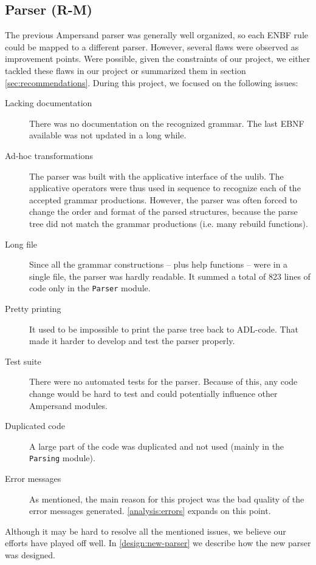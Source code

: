 
\subsection{Parser (R-M)}
\label{analysis:parser}
The previous Ampersand parser was generally well organized, so each ENBF rule could be mapped to a different parser.
However, several flaws were observed as improvement points.
Were possible, given the constraints of our project, we either tackled these flaws in our project or summarized them in section \autoref{sec:recommendations}.
During this project, we focused on the following issues:
\begin{description}
  \item[Lacking documentation]
    There was no documentation on the recognized grammar.
    The last EBNF available was not updated in a long while.
  
  \item[Ad-hoc transformations]
    The parser was built with the applicative interface of the uulib.
    The applicative operators were thus used in sequence to recognize each of the accepted grammar productions.
    However, the parser was often forced to change the order and format of the parsed structures, because the parse tree did not match the grammar productions (i.e. many rebuild functions).
    
  \item[Long file]
    Since all the grammar constructions -- plus help functions -- were in a single file, the parser was hardly readable.
    It summed a total of 823 lines of code only in the \texttt{Parser} module.
  
  \item[Pretty printing]
    It used to be impossible to print the parse tree back to ADL-code.
    That made it harder to develop and test the parser properly.
  
  \item[Test suite]
    There were no automated tests for the parser.
    Because of this, any code change would be hard to test and could potentially influence other Ampersand modules.
  
  \item[Duplicated code]
    A large part of the code was duplicated and not used (mainly in the \texttt{Parsing} module).
  
  \item[Error messages]
    As mentioned, the main reason for this project was the bad quality of the error messages generated.
    \autoref{analysis:errors} expands on this point.
\end{description}
%
Although it may be hard to resolve all the mentioned issues, we believe our efforts have played off well.
In \autoref{design:new-parser} we describe how the new parser was designed.
